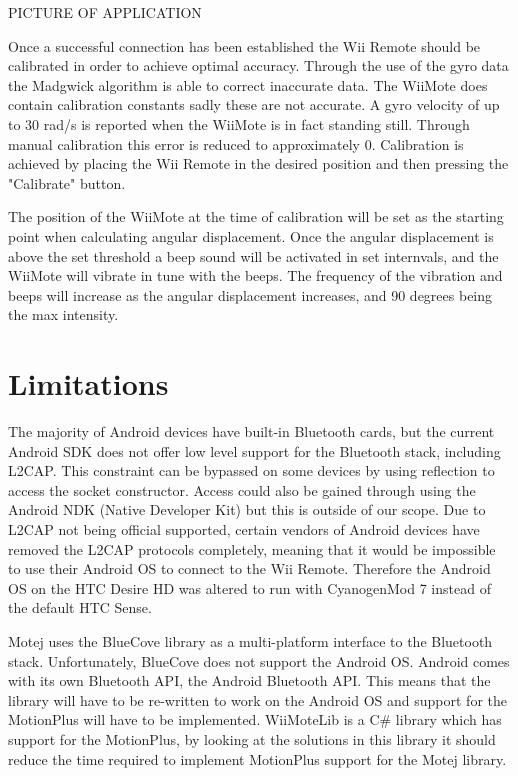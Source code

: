 PICTURE OF APPLICATION

Once a successful connection has been established the Wii Remote should be calibrated in order to achieve optimal accuracy. Through the use of the gyro data the Madgwick algorithm is able to correct inaccurate data. The WiiMote does contain calibration constants sadly these are not accurate. A gyro velocity of up to 30 rad/s is reported when the WiiMote is in fact standing still. Through manual calibration this error is reduced to approximately 0. Calibration is achieved by placing the Wii Remote in the desired position and then pressing the "Calibrate" button.

The position of the WiiMote at the time of calibration will be set as the starting point when calculating angular displacement. Once the angular displacement is above the set threshold a beep sound will be activated in set internvals, and the WiiMote will vibrate in tune with the beeps. The frequency of the vibration and beeps will increase as the angular displacement increases, and 90 degrees being the max intensity.

\section{Limitations}
The majority of Android devices have built-in Bluetooth cards, but the current Android SDK does not offer low level support for the Bluetooth stack, including L2CAP. This constraint can be bypassed on some devices by using reflection to access the socket constructor\cite{l2capHtc}. Access could also be gained through using the Android NDK (Native Developer Kit) but this is outside of our scope. Due to L2CAP not being official supported, certain vendors of Android devices have removed the L2CAP protocols completely, meaning that it would be impossible to use their Android OS to connect to the Wii Remote. Therefore the Android OS on the HTC Desire HD was altered to run with CyanogenMod 7 instead of the default HTC Sense.

Motej uses the BlueCove library as a multi-platform interface to the Bluetooth stack. Unfortunately, BlueCove does not support the Android OS. Android comes with its own Bluetooth API, the Android Bluetooth API. This means that the library will have to be re-written to work on the Android OS and support for the MotionPlus will have to be implemented. WiiMoteLib\cite{wiiMoteLib} is a C\# library which has support for the MotionPlus, by looking at the solutions in this library it should reduce the time required to implement MotionPlus support for the Motej library.
